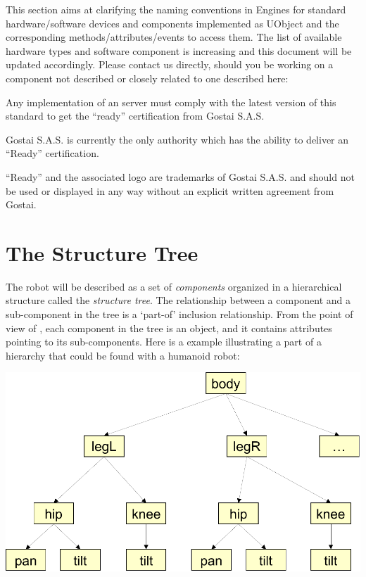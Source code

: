 
This section aims at clarifying the naming conventions in \urbi
Engines for standard hardware/software devices and components
implemented as UObject and the corresponding methods/attributes/events
to access them. The list of available hardware types and software
component is increasing and this document will be updated
accordingly. Please contact us directly, should you be working on a
component not described or closely related to one described here:

\begin{center}
\end{center}

Any implementation of an \urbi server must comply with the latest
version of this standard to get the ``\urbi ready'' certification from
Gostai S.A.S.


Gostai S.A.S. is currently the only authority which has the ability to
deliver an ``\urbi Ready'' certification.

``\urbi Ready'' and the associated logo are trademarks of Gostai
S.A.S. and should not be used or displayed in any way without an
explicit written agreement from Gostai.

\section{The Structure Tree}

The robot will be described as a set of \textit{components} organized
in a hierarchical structure called the \textit{structure tree}. The
relationship between a component and a sub-component in the tree is a
‘part-of’ inclusion relationship. From the point of view of \urbi,
each component in the tree is an object, and it contains attributes
pointing to its sub-components. Here is a example illustrating a part
of a hierarchy that could be found with a humanoid robot:

\begin{center}
  \includegraphics[width=.8\linewidth]{img/structure-tree}
\end{center}

